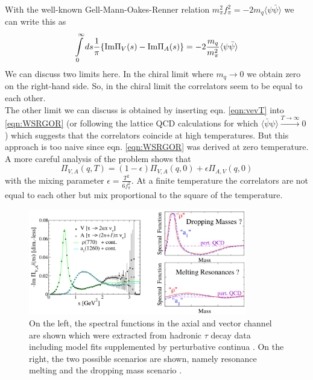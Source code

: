 With the well-known Gell-Mann-Oakes-Renner relation $m_{\pi}^2f_{\pi}^2 = - 2 m_q \langle \psi \bar{\psi} \rangle$ we can write this as
\begin{equation}
\label{eqn:WSRGOR}
\int\limits_0^{\infty} ds \frac{1}{\pi} \lbrace \mathrm{Im}\Pi_V(s) - \mathrm{Im}\Pi_A(s) \rbrace = - 2 \frac{m_q}{m_{\pi}^2} \langle \psi \bar{\psi} \rangle
\end{equation}
We can discuss two limits here. In the chiral limit where $m_q \rightarrow 0$ we obtain zero on the right-hand side. So, in the chiral limit the correlators seem to be equal to each other. \\
The other limit we can discuss is obtained by inserting eqn. \ref{eqn:vevT} into \ref{eqn:WSRGOR} (or following the lattice QCD calculations for which $\langle \bar{\psi} \psi \rangle \overset{T \rightarrow \infty}{\longrightarrow} 0$) which suggests that the correlators coincide at high temperatures. 
But this approach is too naive since eqn. \ref{eqn:WSRGOR} was derived at zero temperature. \\
A more careful analysis of the problem shows that \cite{DeyAVmixing}
\begin{equation}
\Pi_{V,A}(q,T) = (1-\epsilon) \Pi_{V,A}(q,0) + \epsilon \Pi_{A,V}(q,0)
\end{equation}
with the mixing parameter $\epsilon = \frac{T^2}{6f_{\pi}^2}$. At a finite temperature the correlators are not equal to each other but mix proportional to the square of the temperature. \\
\begin{figure}[t]
	\centering
	\includegraphics[width=0.85\textwidth]{Figures/SpectralFunctions}
	\caption{ On the left, the spectral functions in the axial and vector channel are shown which were extracted from hadronic $\tau$ decay data \cite{ALEPHplot} including model fits supplemented by perturbative continua \cite{RappPlot}. On the right, the two possible scenarios are shown, namely resonance melting and the dropping mass scenario \cite{RappChiRes}.}
	\label{fig:SpecFun}
\end{figure}
